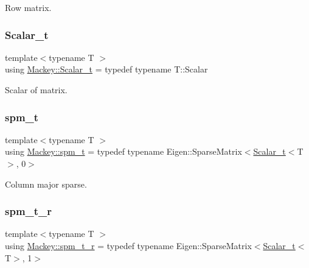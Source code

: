 Row matrix. 

\mbox{\label{namespaceMackey_a93ba297573961f91101fb84bc84bbe95}} 
\subsubsection{\texorpdfstring{Scalar\+\_\+t}{Scalar\_t}}
{\footnotesize\ttfamily template$<$typename T $>$ \\
using \hyperlink{namespaceMackey_a93ba297573961f91101fb84bc84bbe95}{Mackey\+::\+Scalar\+\_\+t} = typedef typename T\+::\+Scalar}



Scalar of matrix. 

\mbox{\label{namespaceMackey_a6fae5aa6894681eabd63f02c387ac618}} 
\subsubsection{\texorpdfstring{spm\+\_\+t}{spm\_t}}
{\footnotesize\ttfamily template$<$typename T $>$ \\
using \hyperlink{namespaceMackey_a6fae5aa6894681eabd63f02c387ac618}{Mackey\+::spm\+\_\+t} = typedef typename Eigen\+::\+Sparse\+Matrix$<$\hyperlink{namespaceMackey_a93ba297573961f91101fb84bc84bbe95}{Scalar\+\_\+t}$<$T$>$, 0$>$}



Column major sparse. 

\mbox{\label{namespaceMackey_a43f350029dd91403df428883f202a7b6}} 
\subsubsection{\texorpdfstring{spm\+\_\+t\+\_\+r}{spm\_t\_r}}
{\footnotesize\ttfamily template$<$typename T $>$ \\
using \hyperlink{namespaceMackey_a43f350029dd91403df428883f202a7b6}{Mackey\+::spm\+\_\+t\+\_\+r} = typedef typename Eigen\+::\+Sparse\+Matrix$<$\hyperlink{namespaceMackey_a93ba297573961f91101fb84bc84bbe95}{Scalar\+\_\+t}$<$T$>$, 1$>$}




